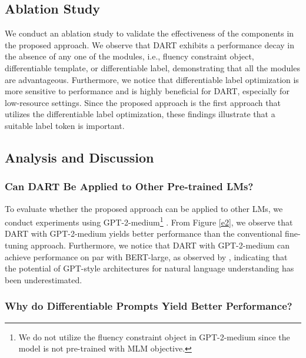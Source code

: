 \documentclass{article} \usepackage{iclr2022_conference,times}
\begin{document}
\subsection{Ablation Study}
We conduct an ablation study to validate the effectiveness of the components in the proposed approach.
We observe that DART exhibits a performance decay in the absence of any one of the modules, i.e., fluency constraint object, differentiable template, or differentiable label, demonstrating that all the modules are advantageous.
Furthermore, we notice that differentiable label optimization is more sensitive to performance and is highly beneficial for DART, especially for low-resource settings. 
Since the proposed approach is the first approach that utilizes the differentiable label optimization, these findings illustrate that a suitable label token is important.

\subsection{Analysis and Discussion}





\subsubsection*{Can DART Be Applied to Other Pre-trained LMs?}

To evaluate whether the proposed approach can be applied to other LMs, we conduct experiments using GPT-2-medium\footnote{
{\color{highlight}
We do not utilize the fluency constraint object in GPT-2-medium since the model is not pre-trained with MLM objective.}
}
.
From Figure \ref{e2}, we observe that DART with GPT-2-medium yields better performance than the conventional fine-tuning approach.
Furthermore, we notice that DART with GPT-2-medium can achieve performance on par with BERT-large, as observed by \cite{DBLP:journals/corr/abs-2103-10385}, indicating that the potential of GPT-style architectures for natural language understanding has been underestimated.



\subsubsection*{Why do Differentiable Prompts Yield Better Performance?}
\end{document}
